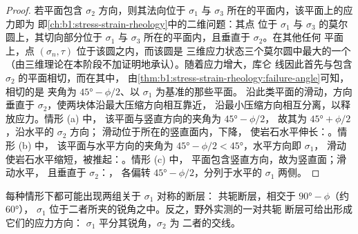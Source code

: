 \begin{proof}
若平面包含 $\sigma_2$ 方向，则其法向位于
$\sigma_1$ 与 $\sigma_3$ 所在的平面内，该平面上的应力即为
即\cref{ch:b1:stress-strain-rheology}中的二维问题：其点
位于 $\sigma_1$ 与 $\sigma_3$ 的莫尔圆上，其切向部分位于
$\sigma_1$ 与 $\sigma_3$ 所在的平面内，且垂直于 $\sigma_2$。在其他任何
平面上，点 $(\sigma_n, \tau)$ 位于该圆之内，而该圆是
三维应力状态三个莫尔圆中最大的一个
（由三维理论在本阶段不加证明地承认）。随着应力增大，库仑
线因此首先与包含 $\sigma_2$ 的平面相切，而在其中，
由\cref{thm:b1:stress-strain-rheology:failure-angle}可知，相切的是
夹角为 $\ang{45} - \phi/2$、以 $\sigma_1$ 为基准的那些平面。
沿此类平面的滑动，方向垂直于 $\sigma_2$，使两块体沿最大压缩方向相互靠近，
沿最小压缩方向相互分离，以释放应力。情形 (a) 中，
该平面与竖直方向的夹角为 $\ang{45} - \phi/2$，
故其为 $\ang{45} + \phi/2$，沿水平的 $\sigma_2$ 方向；
滑动位于所在的竖直面内，下降，
使岩石水平伸长：。情形 (b) 中，
该平面与水平方向的夹角为 $\ang{45} - \phi/2 < \ang{45}$，水平方向即 $\sigma_1$，
滑动使岩石水平缩短，被推起：。情形 (c) 中，
平面包含竖直方向，故为竖直面；滑动水平，
且垂直于 $\sigma_2$：，
各偏转 $\ang{45} - \phi/2$，分列于水平的 $\sigma_1$ 两侧。
\end{proof}

每种情形下都可能出现两组关于 $\sigma_1$ 对称的断层：
共轭断层，相交于 $\ang{90} - \phi$（约 \ang{60}），
$\sigma_1$ 位于二者所夹的锐角之中。反之，野外实测的一对共轭
断层可给出形成它们的应力方向：
$\sigma_1$ 平分其锐角，$\sigma_2$ 为
二者的交线。

